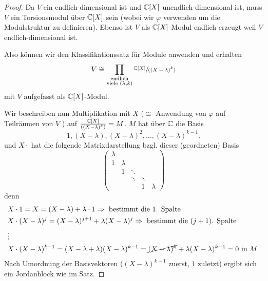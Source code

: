 \begin{proof}
	Da $V$ ein endlich-dimensional ist und $\C[X]$ unendlich-dimensional ist, muss $V$ ein Torsionsmodul über $\C[X]$ sein 
	(wobei wir $\varphi$ verwenden um die Modulstruktur zu definieren).
	Ebenso ist $V$ als $\C[X]$-Modul endlich erzeugt weil $V$ endlich-dimensional ist.

	Also können wir den Klassifikationssatz für Module anwenden und erhalten
	\[
		V \cong \prod_{\substack{\text{endlich}\\\text{viele } (\lambda,k)}} \sfrac{\C[X]}{((X-\lambda)^{k})} 
	\] 
	mit $V$ aufgefasst als $\C[X]$-Modul.

	Wir beschreiben nun Multiplikation mit $X$ ($\cong$ Anwendung von $\varphi$ auf Teilräumen von $V$ ) auf
	$\frac{\C[X]}{((X-\lambda)^{k})} = M$. $M$ hat über $\C$ die Basis
	\[
		1, (X-\lambda), (X-\lambda)^2,\ldots, (X-\lambda)^{k-1}
	.\] 
	und $X \cdot $ hat die folgende Matrixdarstellung bzgl. dieser (geordneten) Basis
	\[
		\begin{pmatrix} 
			\lambda\\
			1 & \lambda\\
			  & 1 &\ddots\\
			  & &\ddots &\ddots\\
			  & & & 1 &\lambda
		\end{pmatrix} 
	\]
	denn
	\begin{align*}
		&X \cdot 1 = X = (X - \lambda) + \lambda \cdot 1 \implies \text{ bestimmt die 1. Spalte}\\
		&X \cdot (X - \lambda)^{j} = (X-\lambda)^{j+1} + \lambda (X - \lambda)^{j} \implies \text{ bestimmt die $(j+1)$. Spalte}\\
		&\vdots\\
		&X \cdot (X-\lambda)^{k-1} = (X - \lambda + \lambda) (X-\lambda)^{k-1} = \cancel{(X-\lambda)^{k}} + \lambda (X-\lambda)^{k-1} = 0 \text{ in } M
	.\end{align*}
	Nach Umordnung der Basisvektoren ($(X-\lambda)^{k-1}$ zuerst, $1$ zuletzt) ergibt sich ein Jordanblock wie im Satz.
\end{proof}




















